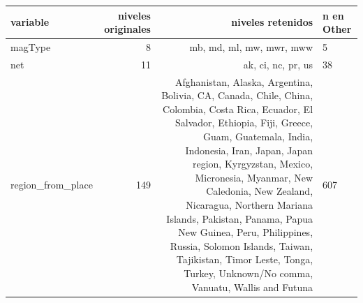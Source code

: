 \begin{tabular}{lrrl}
\toprule
variable & niveles originales & niveles retenidos & n en Other \\
\midrule
magType & 8 & mb, md, ml, mw, mwr, mww & 5 \\
net & 11 & ak, ci, nc, pr, us & 38 \\
region\_from\_place & 149 & Afghanistan, Alaska, Argentina, Bolivia, CA, Canada, Chile, China, Colombia, Costa Rica, Ecuador, El Salvador, Ethiopia, Fiji, Greece, Guam, Guatemala, India, Indonesia, Iran, Japan, Japan region, Kyrgyzstan, Mexico, Micronesia, Myanmar, New Caledonia, New Zealand, Nicaragua, Northern Mariana Islands, Pakistan, Panama, Papua New Guinea, Peru, Philippines, Russia, Solomon Islands, Taiwan, Tajikistan, Timor Leste, Tonga, Turkey, Unknown/No comma, Vanuatu, Wallis and Futuna & 607 \\
\bottomrule
\end{tabular}
